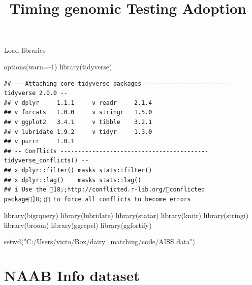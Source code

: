 \documentclass[
]{article}
\title{Timing genomic Testing Adoption}
\author{}
\date{\vspace{-2.5em}}
\newenvironment{Shaded}{\begin{snugshade}}{\end{snugshade}}
\newcommand{\AttributeTok}[1]{\textcolor[rgb]{0.77,0.63,0.00}{#1}}
\newcommand{\DecValTok}[1]{\textcolor[rgb]{0.00,0.00,0.81}{#1}}
\newcommand{\FunctionTok}[1]{\textcolor[rgb]{0.00,0.00,0.00}{#1}}
\newcommand{\NormalTok}[1]{#1}
\newcommand{\SpecialCharTok}[1]{\textcolor[rgb]{0.00,0.00,0.00}{#1}}
\newcommand{\StringTok}[1]{\textcolor[rgb]{0.31,0.60,0.02}{#1}}
\begin{document}
\maketitle

Load libraries

\begin{Shaded}
\begin{Highlighting}[]
\FunctionTok{options}\NormalTok{(}\AttributeTok{warn=}\SpecialCharTok{{-}}\DecValTok{1}\NormalTok{)}
\FunctionTok{library}\NormalTok{(tidyverse)}
\end{Highlighting}
\end{Shaded}

\begin{verbatim}
## -- Attaching core tidyverse packages ------------------------ tidyverse 2.0.0 --
## v dplyr     1.1.1     v readr     2.1.4
## v forcats   1.0.0     v stringr   1.5.0
## v ggplot2   3.4.1     v tibble    3.2.1
## v lubridate 1.9.2     v tidyr     1.3.0
## v purrr     1.0.1     
## -- Conflicts ------------------------------------------ tidyverse_conflicts() --
## x dplyr::filter() masks stats::filter()
## x dplyr::lag()    masks stats::lag()
## i Use the ]8;;http://conflicted.r-lib.org/conflicted package]8;; to force all conflicts to become errors
\end{verbatim}

\begin{Shaded}
\begin{Highlighting}[]
\FunctionTok{library}\NormalTok{(bigrquery)}
\FunctionTok{library}\NormalTok{(lubridate)}
\FunctionTok{library}\NormalTok{(statar)}
\FunctionTok{library}\NormalTok{(knitr)}
\FunctionTok{library}\NormalTok{(stringi)}
\FunctionTok{library}\NormalTok{(broom)}
\FunctionTok{library}\NormalTok{(ggrepel)}
\FunctionTok{library}\NormalTok{(ggfortify)}

\FunctionTok{setwd}\NormalTok{(}\StringTok{"C:/Users/victo/Box/dairy\_matching/code/AISS data"}\NormalTok{)}
\end{Highlighting}
\end{Shaded}

\hypertarget{naab-info-dataset}{%
\section{NAAB Info dataset}\label{naab-info-dataset}}
\end{document}
